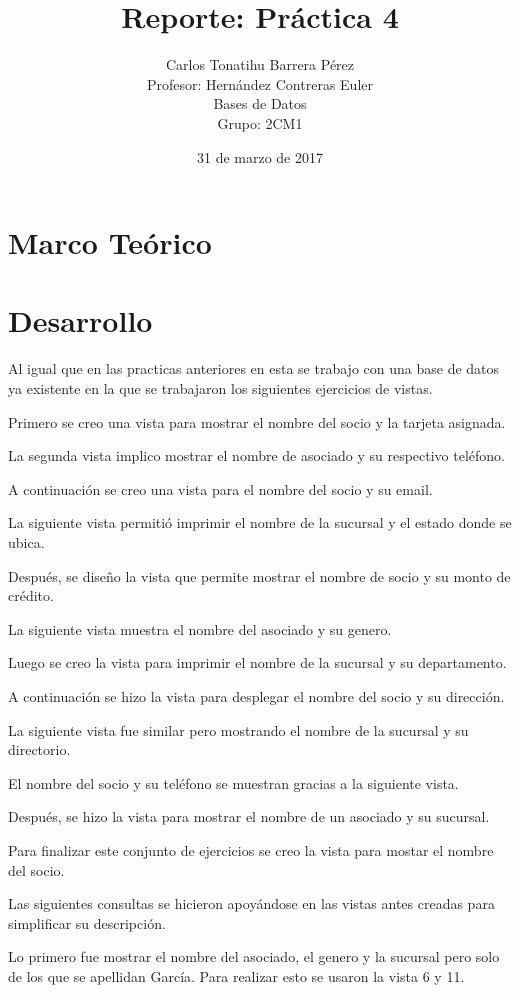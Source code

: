 \documentclass[12pt, titlepage]{article}
\title{Reporte: Práctica 4}
\author{Carlos Tonatihu Barrera Pérez \\ Profesor: Hernández Contreras Euler \\ Bases de Datos \\ Grupo: 2CM1 }
\date{31 de marzo de 2017}
\begin{document}
	\maketitle
	\tableofcontents
	\section{Marco Teórico}
	\section{Desarrollo}
	Al igual que en las practicas anteriores en esta se trabajo con una base de datos ya existente en la que se trabajaron los siguientes ejercicios de vistas.
	
	Primero se creo una vista para mostrar el nombre del socio y la tarjeta asignada.
	
	La segunda vista implico mostrar el nombre de asociado y su respectivo teléfono.
	
	A continuación se creo una vista para el nombre del socio y su email.
	
	La siguiente vista permitió imprimir el nombre de la sucursal y el estado donde se ubica.
	
	Después, se diseño la vista que permite mostrar el nombre de socio y su monto de crédito.
	
	La siguiente vista muestra el nombre del asociado y su genero.
	
	Luego se creo la vista para imprimir el nombre de la sucursal y su departamento.
	
	A continuación se hizo la vista para desplegar el nombre del socio y su dirección.
	
	La siguiente vista fue similar pero mostrando el nombre de la sucursal y su directorio.
	
	El nombre del socio y su teléfono se muestran gracias a la siguiente vista.
	
	Después, se hizo la vista para mostrar el nombre de un asociado y su sucursal.
	
	Para finalizar este conjunto de ejercicios se creo la vista para mostar el nombre del socio.
	
	Las siguientes consultas se hicieron apoyándose en las vistas antes creadas para simplificar su descripción.
	
	Lo primero fue mostrar el nombre del asociado, el genero y la sucursal pero solo de los que se apellidan García. Para realizar esto se usaron la vista 6  y 11.
	
\end{document}
